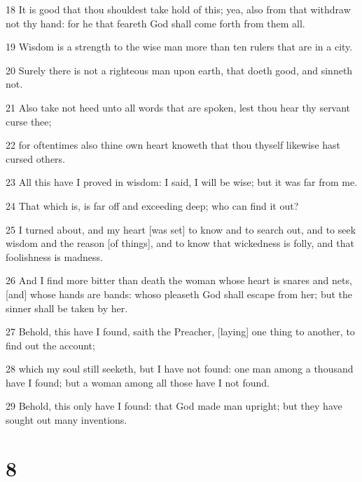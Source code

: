 \par 18 It is good that thou shouldest take hold of this; yea, also from that withdraw not thy hand: for he that feareth God shall come forth from them all.
\par 19 Wisdom is a strength to the wise man more than ten rulers that are in a city.
\par 20 Surely there is not a righteous man upon earth, that doeth good, and sinneth not.
\par 21 Also take not heed unto all words that are spoken, lest thou hear thy servant curse thee;
\par 22 for oftentimes also thine own heart knoweth that thou thyself likewise hast cursed others.
\par 23 All this have I proved in wisdom: I said, I will be wise; but it was far from me.
\par 24 That which is, is far off and exceeding deep; who can find it out?
\par 25 I turned about, and my heart [was set] to know and to search out, and to seek wisdom and the reason [of things], and to know that wickedness is folly, and that foolishness is madness.
\par 26 And I find more bitter than death the woman whose heart is snares and nets, [and] whose hands are bands: whoso pleaseth God shall escape from her; but the sinner shall be taken by her.
\par 27 Behold, this have I found, saith the Preacher, [laying] one thing to another, to find out the account;
\par 28 which my soul still seeketh, but I have not found: one man among a thousand have I found; but a woman among all those have I not found.
\par 29 Behold, this only have I found: that God made man upright; but they have sought out many inventions.

\chapter{8}

